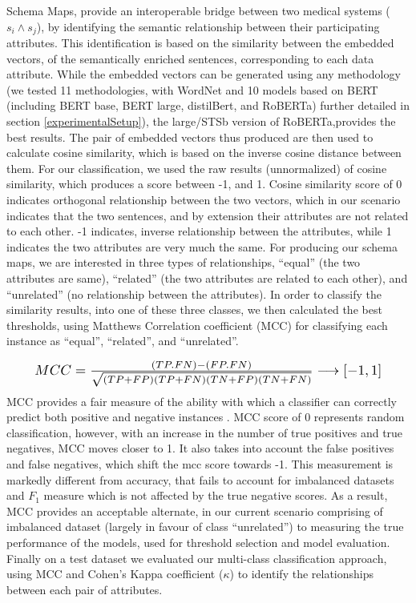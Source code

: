 \documentclass{ieeeaccess}
\begin{document}
Schema Maps, provide an interoperable bridge between two medical systems ($s_i \wedge s_j$), by identifying the semantic relationship between their participating attributes. This identification is based on the similarity between the embedded vectors, of the semantically enriched sentences, corresponding to each data attribute. While the embedded vectors can be generated using any methodology (we tested 11 methodologies, with WordNet and 10 models based on BERT (including BERT base, BERT large, distilBert, and RoBERTa) further detailed in section \ref{experimentalSetup}), the large/STSb version of RoBERTa\cite{reimers-2019-sentence-bert},provides the best results. The pair of embedded vectors thus produced are then used to calculate cosine similarity, which is based on the inverse cosine distance between them. For our classification, we used the raw results (unnormalized) of cosine similarity, which produces a score between -1, and 1. Cosine similarity score of 0 indicates orthogonal relationship between the two vectors, which in our scenario indicates that the two sentences, and by extension their attributes are not related to each other. -1 indicates, inverse relationship between the attributes, while 1 indicates the two attributes are very much the same.
For producing our schema maps, we are interested in three types of relationships, ``equal'' (the two attributes are same), ``related'' (the two attributes are related to each other), and ``unrelated'' (no relationship between the attributes). In order to classify the similarity results, into one of these three classes, we then calculated the best thresholds, using Matthews Correlation coefficient (MCC) \cite{chicco2020advantages} for classifying each instance as ``equal'', ``related'', and ``unrelated''. 

\begin{equation}
\resizebox{0.9\hsize}{!}{$%
	MCC = \frac{(TP.FN) - (FP.FN)}{\sqrt{(TP+FP)(TP+FN)(TN+FP)(TN+FN)}}\longrightarrow [-1,1]
	$%
}%
\end{equation}
MCC provides a fair measure of the ability with which a classifier can correctly predict both positive and negative instances \cite{chicco2020advantages}. MCC score of 0 represents random classification, however, with an increase in the number of true positives and true negatives, MCC moves closer to 1. It also takes into account the false positives and false negatives, which shift the mcc score towards -1. This measurement is markedly different from accuracy, that fails to account for imbalanced datasets and $F_1$ measure which is not affected by the true negative scores. As a result, MCC provides an acceptable alternate, in our current scenario comprising of imbalanced dataset (largely in favour of class ``unrelated'') to measuring the true performance of the models, used for threshold selection and model evaluation. Finally on a test dataset we evaluated our multi-class classification approach, using MCC and Cohen's Kappa coefficient ($\kappa$) \cite{gwet2014handbook} to identify the relationships between each pair of attributes.
\end{document}
